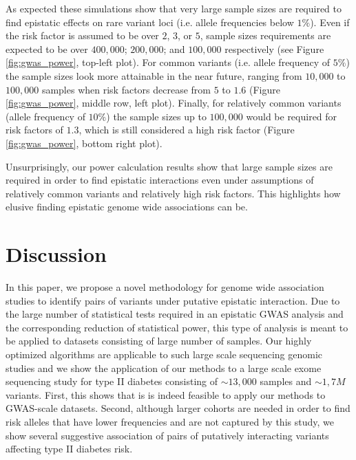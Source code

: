 As expected these simulations show that very large sample sizes are required to find epistatic effects on rare variant loci (i.e. allele frequencies below $1\%$).
Even if the risk factor is assumed to be over $2$, $3$, or $5$, sample sizes requirements are expected to be over $400,000$; $200,000$; and $100,000$ respectively (see Figure \ref{fig:gwas_power}, top-left plot).
For common variants (i.e. allele frequency of $5\%$) the sample sizes look more attainable in the near future, ranging from $10,000$ to $100,000$ samples when risk factors decrease from $5$ to $1.6$ (Figure \ref{fig:gwas_power}, middle row, left plot).
Finally, for relatively common variants (allele frequency of $10\%$) the sample sizes up to $100,000$ would be required for risk factors of $1.3$, which is still considered a high risk factor (Figure \ref{fig:gwas_power}, bottom right plot).

Unsurprisingly, our power calculation results show that large sample sizes are required in order to find epistatic interactions even under assumptions of relatively common variants and relatively high risk factors.
This highlights how elusive finding epistatic genome wide associations can be.

\section{Discussion}

In this paper, we propose a novel methodology for genome wide association studies to identify pairs of variants under putative epistatic interaction. 
Due to the large number of statistical tests required in an epistatic GWAS analysis and the corresponding reduction of statistical power, this type of analysis is meant to be applied to datasets consisting of large number of samples.
Our highly optimized algorithms are applicable to such large scale sequencing genomic studies and we show the application of our methods to a large scale exome sequencing study for type II diabetes consisting of $\sim 13,000$ samples and $\sim 1,7M$ variants. 
First, this shows that is is indeed feasible to apply our methods to GWAS-scale datasets. 
Second, although larger cohorts are needed in order to find risk alleles that have lower frequencies and are not captured by this study, we show several suggestive association of pairs of putatively interacting variants affecting type II diabetes risk. 

